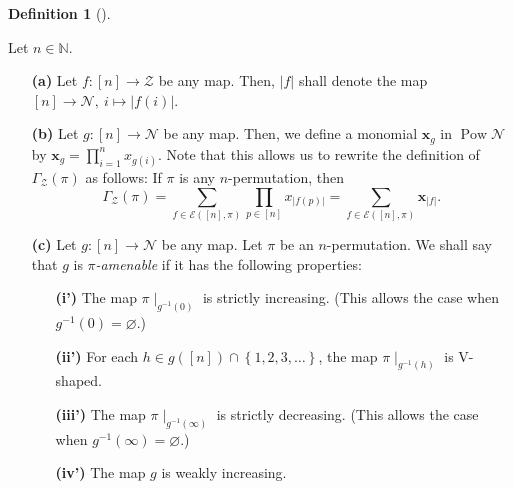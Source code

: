 \documentclass[numbers=enddot,12pt,final,onecolumn,notitlepage]{scrartcl}%
\theoremstyle{definition}
\newtheorem{defi}[theo]{Definition}
\newenvironment{definition}[1][]
{\begin{defi}[#1]\begin{leftbar}}
{\end{leftbar}\end{defi}}
\let\sumnonlimits\sum
\let\prodnonlimits\prod
\renewcommand{\sum}{\sumnonlimits\limits}
\renewcommand{\prod}{\prodnonlimits\limits}
\begin{document}
\begin{definition}
Let $n\in\mathbb{N}$.

\begin{enumerate}
\item[\textbf{(a)}] Let $f:\left[  n\right]  \rightarrow\mathcal{Z}$ be any
map. Then, $\left\vert f\right\vert $ shall denote the map $\left[  n\right]
\rightarrow\mathcal{N},\ i\mapsto\left\vert f\left(  i\right)  \right\vert $.

\item[\textbf{(b)}] Let $g:\left[  n\right]  \rightarrow\mathcal{N}$ be any
map. Then, we define a monomial $\mathbf{x}_{g}$ in $\operatorname*{Pow}%
\mathcal{N}$ by $\mathbf{x}_{g}=\prod_{i=1}^{n}x_{g\left(  i\right)  }$. Note
that this allows us to rewrite the definition of $\Gamma_{\mathcal{Z}}\left(
\pi\right)  $ as follows: If $\pi$ is any $n$-permutation, then%
\begin{equation}
\Gamma_{\mathcal{Z}}\left(  \pi\right)  =\sum_{f\in\mathcal{E}\left(  \left[
n\right]  ,\pi\right)  }\prod_{p\in\left[  n\right]  }x_{\left\vert f\left(
p\right)  \right\vert }=\sum_{f\in\mathcal{E}\left(  \left[  n\right]
,\pi\right)  }\mathbf{x}_{\left\vert f\right\vert }. \label{eq.Gamma.rewr}%
\end{equation}


\item[\textbf{(c)}] Let $g:\left[  n\right]  \rightarrow\mathcal{N}$ be any
map. Let $\pi$ be an $n$-permutation. We shall say that $g$ is $\pi
$\textit{-amenable} if it has the following properties:

\begin{enumerate}
\item[\textbf{(i')}] The map $\pi\mid_{g^{-1}\left(  0\right)  }$ is strictly
increasing. (This allows the case when $g^{-1}\left(  0\right)  =\varnothing$.)

\item[\textbf{(ii')}] For each $h\in g\left(  \left[  n\right]  \right)
\cap\left\{  1,2,3,\ldots\right\}  $, the map $\pi\mid_{g^{-1}\left(
h\right)  }$ is V-shaped.

\item[\textbf{(iii')}] The map $\pi\mid_{g^{-1}\left(  \infty\right)  }$ is
strictly decreasing. (This allows the case when $g^{-1}\left(  \infty\right)
=\varnothing$.)

\item[\textbf{(iv')}] The map $g$ is weakly increasing.
\end{enumerate}
\end{enumerate}
\end{definition}
\end{document}
